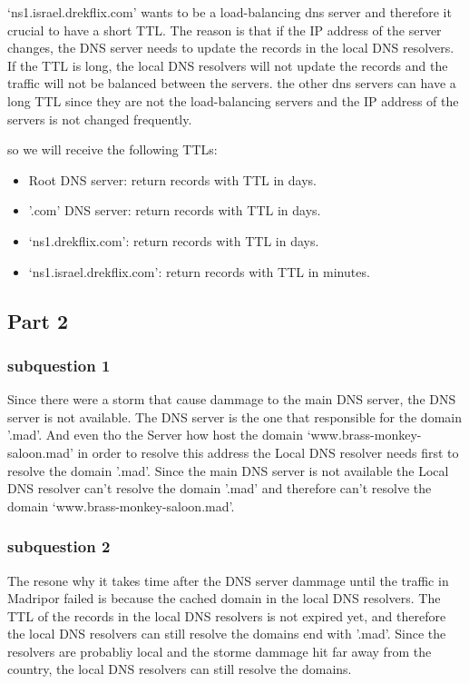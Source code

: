 \documentclass{article}
\begin{document}
`ns1.israel.drekflix.com' wants to be a load-balancing dns server and therefore it crucial to have a short TTL. The reason is that if the IP address of the server changes, the DNS server needs to update the records in the local DNS resolvers. If the TTL is long, the local DNS resolvers will not update the records and the traffic will not be balanced between the servers.
the other dns servers can have a long TTL since they are not the load-balancing servers and the IP address of the servers is not changed frequently.

so we will receive the following TTLs:
\begin{itemize}
    \item Root DNS server: return records with TTL in days.
    \item '.com' DNS server: return records with TTL in days.
    \item `ns1.drekflix.com': return records with TTL in days.
    \item `ns1.israel.drekflix.com': return records with TTL in minutes.
    \end{itemize}

\subsection{Part 2}


\subsubsection{subquestion 1}
Since there were a storm that cause dammage to the main DNS server, the DNS server is not available. The DNS server is the one that responsible for the domain '.mad'. And even tho the Server how host the domain `www.brass-monkey-saloon.mad' in order to resolve this address the Local DNS resolver needs first to resolve the domain '.mad'. Since the main DNS server is not available the Local DNS resolver can't resolve the domain '.mad' and therefore can't resolve the domain `www.brass-monkey-saloon.mad'. 
\subsubsection{subquestion 2}
The resone why it takes time after the DNS server dammage until the traffic in Madripor failed is because the cached domain in the local DNS resolvers. The TTL of the records in the local DNS resolvers is not expired yet, and therefore the local DNS resolvers can still resolve the domains end with '.mad'. Since the resolvers are probabliy local and the storme dammage hit far away from the country, the local DNS resolvers can still resolve the domains. 
\end{document}
